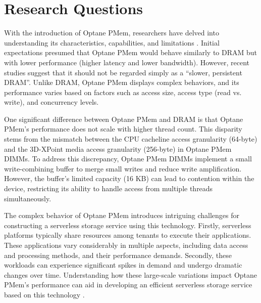 
\section{Research Questions}

With the introduction of Optane PMem, researchers have delved into understanding its characteristics, capabilities, and limitations \cite{izraelevitz2019basic, yang2020empirical, wu2020ribbon}. Initial expectations presumed that Optane PMem would behave similarly to DRAM but with lower performance (higher latency and lower bandwidth). However, recent studies suggest that it should not be regarded simply as a “slower, persistent DRAM”. Unlike DRAM, Optane PMem displays complex behaviors, and its performance varies based on factors such as access size, access type (read vs. write), and concurrency levels.

One significant difference between Optane PMem and DRAM is that Optane PMem's performance does not scale with higher thread count. This disparity stems from the mismatch between the CPU cacheline access granularity (64-byte) and the 3D-XPoint media access granularity (256-byte) in Optane PMem DIMMs. To address this discrepancy, Optane PMem DIMMs implement a small write-combining buffer to merge small writes and reduce write amplification. However, the buffer’s limited capacity (16 KB) can lead to contention within the device, restricting its ability to handle access from multiple threads simultaneously.

The complex behavior of Optane PMem introduces intriguing challenges for constructing a serverless storage service using this technology. Firstly, serverless platforms typically share resources among tenants to execute their applications. These applications vary considerably in multiple aspects, including data access and processing methods, and their performance demands. Secondly, these workloads can experience significant spikes in demand and undergo dramatic changes over time. Understanding how these large-scale variations impact Optane PMem's performance can aid in developing an efficient serverless storage service based on this technology \cite{klimovic2018pocket,jonas2019cloud}.

